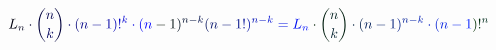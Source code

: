 \documentclass[12pt]{article}
\begin{document}
\makeatletter
\renewcommand*{\@textcolor}[3]{%
  \protect\leavevmode
  \begingroup
    \color#1{#2}#3%
  \endgroup
}
\makeatother
\begin{displaymath}
\mathcolor[RGB]{0,0,15}{L} _ { \mathcolor[RGB]{0,0,30}{n} } \mathcolor[RGB]{0,0,45}{\cdot} \mathcolor[RGB]{0,0,60}{\binom { \mathcolor[RGB]{0,0,75}{n} } { \mathcolor[RGB]{0,0,90}{k} } } \mathcolor[RGB]{0,0,105}{\cdot} \mathcolor[RGB]{0,0,120}{(} \mathcolor[RGB]{0,0,135}{n} \mathcolor[RGB]{0,0,150}{-} \mathcolor[RGB]{0,0,165}{1} \mathcolor[RGB]{0,0,180}{)} \mathcolor[RGB]{0,0,195}{!} ^ { \mathcolor[RGB]{0,0,210}{k} } \mathcolor[RGB]{0,0,225}{\cdot} \mathcolor[RGB]{0,0,240}{(} \mathcolor[RGB]{0,0,255}{n} \mathcolor[RGB]{0,15,0}{-} \mathcolor[RGB]{0,15,15}{1} \mathcolor[RGB]{0,15,30}{)} ^ { \mathcolor[RGB]{0,15,45}{n} \mathcolor[RGB]{0,15,60}{-} \mathcolor[RGB]{0,15,75}{k} } \mathcolor[RGB]{0,15,90}{(} \mathcolor[RGB]{0,15,105}{n} \mathcolor[RGB]{0,15,120}{-} \mathcolor[RGB]{0,15,135}{1} \mathcolor[RGB]{0,15,150}{!} \mathcolor[RGB]{0,15,165}{)} ^ { \mathcolor[RGB]{0,15,180}{n} \mathcolor[RGB]{0,15,195}{-} \mathcolor[RGB]{0,15,210}{k} } \mathcolor[RGB]{0,15,225}{=} \mathcolor[RGB]{0,15,240}{L} _ { \mathcolor[RGB]{0,15,255}{n} } \mathcolor[RGB]{0,30,0}{\cdot} \mathcolor[RGB]{0,30,15}{\binom { \mathcolor[RGB]{0,30,30}{n} } { \mathcolor[RGB]{0,30,45}{k} } } \mathcolor[RGB]{0,30,60}{\cdot} \mathcolor[RGB]{0,30,75}{(} \mathcolor[RGB]{0,30,90}{n} \mathcolor[RGB]{0,30,105}{-} \mathcolor[RGB]{0,30,120}{1} \mathcolor[RGB]{0,30,135}{)} ^ { \mathcolor[RGB]{0,30,150}{n} \mathcolor[RGB]{0,30,165}{-} \mathcolor[RGB]{0,30,180}{k} } \mathcolor[RGB]{0,30,195}{\cdot} \mathcolor[RGB]{0,30,210}{(} \mathcolor[RGB]{0,30,225}{n} \mathcolor[RGB]{0,30,240}{-} \mathcolor[RGB]{0,30,255}{1} \mathcolor[RGB]{0,45,0}{)} \mathcolor[RGB]{0,45,15}{!} ^ { \mathcolor[RGB]{0,45,30}{n} }
\end{displaymath}
\end{document}
